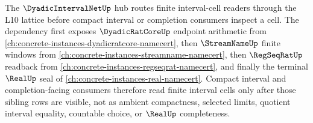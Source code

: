 The $\DyadicIntervalNetUp$ hub routes finite interval-cell readers through the L10 lattice before compact interval or completion consumers inspect a cell. The dependency first exposes $\DyadicRatCoreUp$ endpoint arithmetic from \autoref{ch:concrete-instances-dyadicratcore-namecert}, then $\StreamNameUp$ finite windows from \autoref{ch:concrete-instances-streamname-namecert}, then $\RegSeqRatUp$ readback from \autoref{ch:concrete-instances-regseqrat-namecert}, and finally the terminal $\RealUp$ seal of \autoref{ch:concrete-instances-real-namecert}. Compact interval and completion-facing consumers therefore read finite interval cells only after those sibling rows are visible, not as ambient compactness, selected limits, quotient interval equality, countable choice, or $\RealUp$ completeness.
